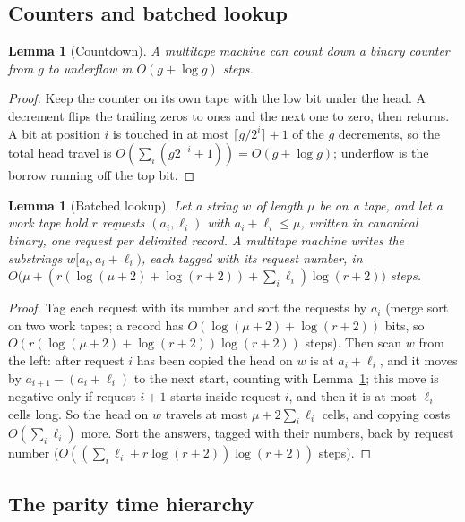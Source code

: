 \documentclass[11pt]{article}
\newtheorem{lemma}[theorem]{Lemma}
\theoremstyle{definition}
\theoremstyle{remark}
\begin{document}
\subsection{Counters and batched lookup}
\begin{lemma}[Countdown]\label{lem:countdown}
A multitape machine can count down a binary counter from $g$ to underflow in $O(g+\log g)$ steps.
\end{lemma}
\begin{proof}
Keep the counter on its own tape with the low bit under the head. A decrement flips the trailing zeros to ones and the next
one to zero, then returns. A bit at position $i$ is touched in at most $\lceil g/2^{i}\rceil+1$ of the $g$ decrements, so the
total head travel is $O(\sum_i (g2^{-i}+1))=O(g+\log g)$; underflow is the borrow running off the top bit.
\end{proof}

\begin{lemma}[Batched lookup]\label{lem:batch}
Let a string $w$ of length $\mu$ be on a tape, and let a work tape hold $r$ requests $(a_i,\ell_i)$ with $a_i+\ell_i\le\mu$,
written in canonical binary, one request per delimited record. A multitape machine writes the substrings $w[a_i,a_i+\ell_i)$, each tagged with its request number, in
$O\bigl(\mu+(r(\log(\mu+2)+\log(r+2))+\sum_i\ell_i)\log(r+2)\bigr)$ steps.
\end{lemma}
\begin{proof}
Tag each request with its number and sort the requests by $a_i$ (merge sort on two work tapes; a record has
$O(\log(\mu+2)+\log(r+2))$ bits, so $O(r(\log(\mu+2)+\log(r+2))\log(r+2))$ steps). Then scan $w$ from the left: after request $i$
has been copied the head on $w$ is at $a_i+\ell_i$, and it moves by $a_{i+1}-(a_i+\ell_i)$ to the next start, counting with
Lemma~\ref{lem:countdown}; this move is negative only if request $i+1$ starts inside request $i$, and then it is at most $\ell_i$
cells long. So the head on $w$ travels at most $\mu+2\sum_i\ell_i$ cells, and copying costs $O(\sum_i\ell_i)$ more. Sort the
answers, tagged with their numbers, back by request number ($O((\sum_i\ell_i+r\log(r+2))\log(r+2))$ steps).
\end{proof}

\subsection{The parity time hierarchy}
\end{document}
